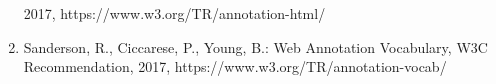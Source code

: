 \documentclass[a4paper]{llncs}
\begin{document}
\begin{enumerate}
2017, \empty https://www.w3.org/TR/annotation-html/\item Sanderson, R., Ciccarese, P., Young, B.: Web Annotation Vocabulary, W3C Recommendation, 2017, \empty https://www.w3.org/TR/annotation-vocab/
    \end{enumerate}
  
                        
                    
                
            
        
\end{document}

